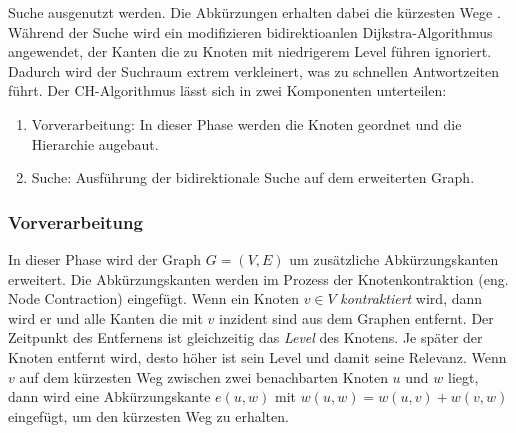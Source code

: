 Suche ausgenutzt werden. Die Abkürzungen erhalten dabei die kürzesten Wege \cite{Bast.20.04.2015}.
Während der Suche wird ein modifizieren bidirektioanlen Dijkstra-Algorithmus angewendet, der Kanten
die zu Knoten mit niedrigerem Level führen ignoriert. Dadurch wird der Suchraum extrem verkleinert,
was zu schnellen Antwortzeiten führt. Der CH-Algorithmus lässt sich in zwei Komponenten unterteilen:
\begin{enumerate}
    \item Vorverarbeitung: In dieser Phase werden die Knoten geordnet und die Hierarchie augebaut.
    \item Suche: Ausführung der bidirektionale Suche auf dem erweiterten Graph.
\end{enumerate}


\subsubsection{Vorverarbeitung}
In dieser Phase wird der Graph $G = (V,E)$ um zusätzliche Abkürzungskanten erweitert. Die
Abkürzungskanten werden im Prozess der Knotenkontraktion (eng. Node Contraction) eingefügt. Wenn ein
Knoten $v \in V$ \emph{kontraktiert} wird, dann wird er und alle Kanten die mit $v$ inzident sind
aus dem Graphen entfernt. Der Zeitpunkt des Entfernens ist gleichzeitig das \emph{Level} des
Knotens. Je später der Knoten entfernt wird, desto höher ist sein Level und damit seine Relevanz.
Wenn $v$ auf dem kürzesten Weg zwischen zwei benachbarten Knoten $u$ und $w$ liegt, dann wird eine
Abkürzungskante $e(u,w)$ mit $w(u,w) = w(u,v) + w(v,w)$ eingefügt, um den kürzesten Weg zu erhalten.

